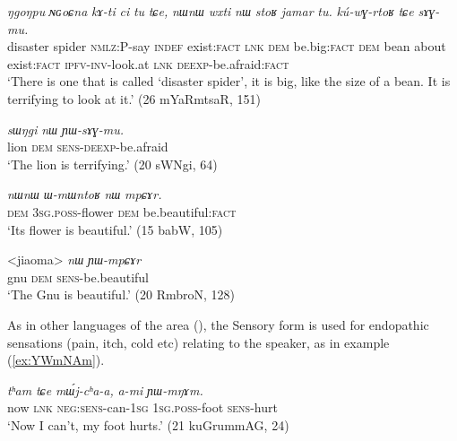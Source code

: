 \documentclass[11pt]{article}
\newcommand{\ipa}[1]{{\phon\textit{#1}}} %
\newcommand{\refb}[1]{(\ref{#1})}
\newcommand{\factual}[1]{\textsc{:fact}}
\begin{document}
 \begin{exe}
\ex \label{ex:sAGmu}
\gll 
\ipa{ŋgoŋpu}  	\ipa{ɴɢoɕna}  	\ipa{kɤ-ti}  	\ipa{ci}  	\ipa{tu}  	\ipa{tɕe,}  	\ipa{nɯnɯ}  	\ipa{wxti}  	\ipa{nɯ}  	\ipa{stoʁ}  	\ipa{jamar}  	\ipa{tu.}  	\ipa{kú-wɣ-rtoʁ}  	\ipa{tɕe}  	\ipa{sɤɣ-mu.}  \\
disaster spider \textsc{nmlz}:P-say \textsc{indef} exist\factual{} \textsc{lnk} \textsc{dem} be.big\factual{}  \textsc{dem} bean about exist\factual{} \textsc{ipfv-inv}-look.at \textsc{lnk} \textsc{deexp}-be.afraid\factual{}  \\
\glt `There is one that is  called `disaster spider', it is big, like the size of a bean. It is terrifying to look at it.' (26 mYaRmtsaR, 151)
\end{exe}

\begin{exe}
\ex \label{ex:YWsAGmu}
\gll 
\ipa{sɯŋgi}  	\ipa{nɯ}  	\ipa{ɲɯ-sɤɣ-mu.}  \\
lion \textsc{dem} \textsc{sens-deexp}-be.afraid \\
\glt `The lion is terrifying.' (20 sWNgi, 64)
\end{exe}


\begin{exe}
\ex \label{ex:mpCAr}
\gll
\ipa{nɯnɯ}  	\ipa{ɯ-mɯntoʁ}  	\ipa{nɯ}  	\ipa{mpɕɤr.}  \\
\textsc{dem} \textsc{3sg.poss}-flower \textsc{dem} be.beautiful\factual{} \\
\glt `Its flower is beautiful.' (15 babW, 105)
\end{exe}


\begin{exe}
\ex \label{ex:YWmpCAr}
\gll 
<jiaoma> 	\ipa{nɯ}  	\ipa{ɲɯ-mpɕɤr}  \\
gnu \textsc{dem} \textsc{sens}-be.beautiful \\
\glt `The Gnu is beautiful.' (20 RmbroN, 128)
\end{exe}

As in other languages of the area (\citealt{tournadre14evidentiality}), the Sensory form is used for endopathic sensations (pain, itch, cold etc)  relating to the speaker, as in example \refb{ex:YWmNAm}.

\begin{exe}
\ex \label{ex:YWmNAm}
\gll
\ipa{tʰam} 	\ipa{tɕe} 	\ipa{mɯ́j-cʰa-a,} 	\ipa{a-mi} 	\ipa{ɲɯ-mŋɤm.} \\
now \textsc{lnk} \textsc{neg:sens}-can-\textsc{1sg} \textsc{1sg.poss}-foot \textsc{sens}-hurt \\
\glt `Now I can't, my foot hurts.' (21 kuGrummAG, 24)
\end{exe}
\end{document}
